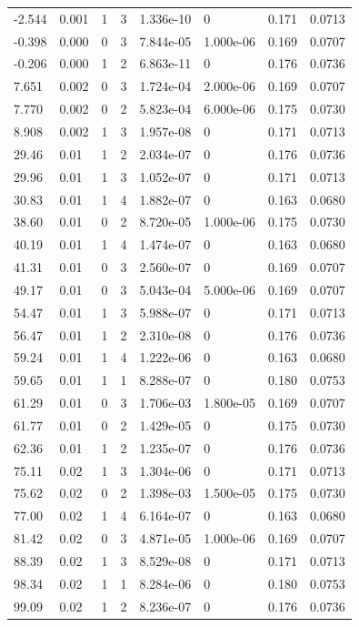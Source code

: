 \documentclass[preview]{standalone}
\begin{document}
{{\begin{tabular}{L{1.2cm}C{1.2cm} C{0.3cm}C{0.5cm} C{1.4cm}C{1.4cm} C{1.4cm}C{1.4cm}}
  -2.544  &  0.001  & 1     &  3 &  1.336e-10  & 0  & 0.171 &  0.0713   \\ 
  -0.398  &  0.000  & 0     &  3 &  7.844e-05  & 1.000e-06  & 0.169 &  0.0707   \\ 
  -0.206  &  0.000  & 1     &  2 &  6.863e-11  & 0  & 0.176 &  0.0736   \\ 
  7.651  &  0.002  & 0     &  3 &  1.724e-04  & 2.000e-06  & 0.169 &  0.0707   \\ 
  7.770  &  0.002  & 0     &  2 &  5.823e-04  & 6.000e-06  & 0.175 &  0.0730   \\ 
  8.908  &  0.002  & 1     &  3 &  1.957e-08  & 0  & 0.171 &  0.0713   \\ 
  29.46  &  0.01  & 1     &  2 &  2.034e-07  & 0  & 0.176 &  0.0736   \\ 
  29.96  &  0.01  & 1     &  3 &  1.052e-07  & 0  & 0.171 &  0.0713   \\ 
  30.83  &  0.01  & 1     &  4 &  1.882e-07  & 0  & 0.163 &  0.0680   \\ 
  38.60  &  0.01  & 0     &  2 &  8.720e-05  & 1.000e-06  & 0.175 &  0.0730   \\ 
  40.19  &  0.01  & 1     &  4 &  1.474e-07  & 0  & 0.163 &  0.0680   \\ 
  41.31  &  0.01  & 0     &  3 &  2.560e-07  & 0  & 0.169 &  0.0707   \\ 
  49.17  &  0.01  & 0     &  3 &  5.043e-04  & 5.000e-06  & 0.169 &  0.0707   \\ 
  54.47  &  0.01  & 1     &  3 &  5.988e-07  & 0  & 0.171 &  0.0713   \\ 
  56.47  &  0.01  & 1     &  2 &  2.310e-08  & 0  & 0.176 &  0.0736   \\ 
  59.24  &  0.01  & 1     &  4 &  1.222e-06  & 0  & 0.163 &  0.0680   \\ 
  59.65  &  0.01  & 1     &  1 &  8.288e-07  & 0  & 0.180 &  0.0753   \\ 
  61.29  &  0.01  & 0     &  3 &  1.706e-03  & 1.800e-05  & 0.169 &  0.0707   \\ 
  61.77  &  0.01  & 0     &  2 &  1.429e-05  & 0  & 0.175 &  0.0730   \\ 
  62.36  &  0.01  & 1     &  2 &  1.235e-07  & 0  & 0.176 &  0.0736   \\ 
  75.11  &  0.02  & 1     &  3 &  1.304e-06  & 0  & 0.171 &  0.0713   \\ 
  75.62  &  0.02  & 0     &  2 &  1.398e-03  & 1.500e-05  & 0.175 &  0.0730   \\ 
  77.00  &  0.02  & 1     &  4 &  6.164e-07  & 0  & 0.163 &  0.0680   \\ 
  81.42  &  0.02  & 0     &  3 &  4.871e-05  & 1.000e-06  & 0.169 &  0.0707   \\ 
  88.39  &  0.02  & 1     &  3 &  8.529e-08  & 0  & 0.171 &  0.0713   \\ 
  98.34  &  0.02  & 1     &  1 &  8.284e-06  & 0  & 0.180 &  0.0753   \\ 
  99.09  &  0.02  & 1     &  2 &  8.236e-07  & 0  & 0.176 &  0.0736   \\ 
\hline 
\end{tabular} 

}}
\end{document}
